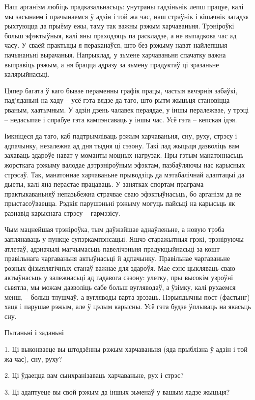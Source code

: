 Наш арганізм любіць прадказальнасьць: унутраны гадзіньнік лепш працуе, калі мы засынаем і прачынаемся ў адзін і той жа час, наш страўнік і кішачнік загадзя рыхтуюцца да прыёму ежы, таму так важны рэжым харчаваньня. Трэніроўкі больш эфэктыўныя, калі яны праходзяць па раскладзе, а не выпадкова час ад часу. У сваёй практыцы я пераканаўся, што без рэжыму нават найлепшыя пачынаньні вырачаныя. Напрыклад, у зьмене харчаваньня спачатку важна выправіць рэжым, а ня брацца адразу за зьмену прадуктаў ці зразаньне калярыйнасьці.

Цяпер багата ў каго бывае пераменны графік працы, частыя вячэрнія забаўкі, пад'яданьні на хаду – усё гэта вядзе да таго, што рытм жыцьця становіцца рваным, хаатычным. У адзін дзень чалавек пераядае, у іншы пералежвае, у трэці – недасыпае і спрабуе гэта кампэнсаваць у іншы час. Усё гэта – кепская ідэя. 

Імкніцеся да таго, каб падтрымліваць рэжым харчаваньня, сну, руху, стрэсу і адпачынку, незалежна ад дня тыдня ці сэзону. Такі лад жыцьця дазволіць вам захаваць здароўе нават у моманты моцных нагрузак. Пры гэтым манатоннасьць жорсткага рэжыму валодае дэтрэніроўным эфэктам, пазбаўляючы нас карысных стрэсаў. Так, манатоннае харчаваньне прыводзіць да мэтабалічнай адаптацыі да дыеты, калі яна перастае працаваць. У занятках спортам праграма практыкаваньняў непазьбежна страчвае сваю эфэктыўнасьць, бо арганізм да яе прыстасоўваецца. Рэдкія парушэньні рэжыму могуць пайсьці на карысьць як разнавід карыснага стрэсу – гармэзісу.

Чым мацнейшая трэніроўка, тым даўжэйшае аднаўленьне, а новую трэба заплянаваць у пункце супэркампэнсацыі. Яшчэ старажытныя грэкі, трэніруючы атлетаў, адзначылі магчымасьць павелічэньня прадукцыйнасьці за кошт правільнага чаргаваньня актыўнасьці й адпачынку. Правільнае чаргаваньне розных фізыялягічных станаў важнае для здароўя. Мае сэнс цыкляваць сваю актыўнасьць у залежнасьці ад гадавога сэзону: улетку, пры высокім узроўні сьвятла, мы можам дазволіць сабе больш вугляводаў, а ўзімку, калі рухаемся менш, – больш тлушчаў, а вугляводы варта зрэзаць. Пэрыядычны пост (фастынг) хаця і парушае рэжым, але ў цэлым карысны. Усё гэта будзе ўплываць на якасьць сну.

Пытаньні і заданьні

1. Ці выконваеце вы штодзённы рэжым харчаваньня (яда прыблізна ў адзін і той жа час), сну, руху?

2. Ці ўдаецца вам сынхранізаваць харчаваньне, рух і стрэс?

3. Ці адаптуеце вы свой рэжым да іншых зьменаў у вашым ладзе жыцьця?


